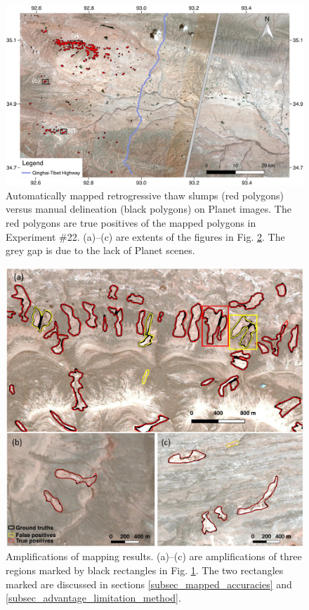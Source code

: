 \documentclass[authoryear,preprint,review,12pt]{elsarticle}
\begin{document}
\begin{figure}
	\centering
	\includegraphics[width=14cm]{figures/whole_area_mapped_trim.jpg}
	\caption{Automatically mapped retrogressive thaw slumps (red polygons) versus manual delineation (black polygons) on Planet images. The red polygons are true positives of the mapped polygons in Experiment \#22. (a)--(c) are extents of the figures in Fig. \ref{fig_zoomin_mapped_rts}. The grey gap is due to the lack of Planet scenes.}
	\label{fig_mapped_rts}
\end{figure}

\begin{figure}
	\centering
	\includegraphics[width=12cm]{figures/zoom_in_mapped_polygons_trim.jpg}
	\caption{Amplifications of mapping results. (a)--(c) are amplifications of three regions marked by black rectangles in Fig. \ref{fig_mapped_rts}. The two rectangles marked are discussed in sections \ref{subsec_mapped_accuracies} and \ref{subsec_advantage_limitation_method}.}
	\label{fig_zoomin_mapped_rts}
\end{figure}
\end{document}
